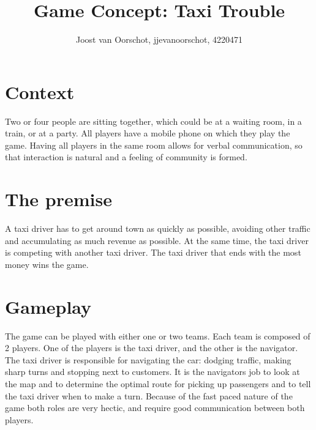 \documentclass[11pt,twoside,a4paper]{article}
\title{Game Concept: Taxi Trouble} %
\author{
        Joost van Oorschot, jjevanoorschot, 4220471
}
\begin{document}
\maketitle


\section*{Context}
Two or four people are sitting together, which could be at a waiting room, in a train, or at a party. All players have a mobile phone on which they play the game. Having all players in the same room allows for verbal communication, so that interaction is natural and a feeling of community is formed.

\section*{The premise}
A taxi driver has to get around town as quickly as possible, avoiding other traffic and accumulating as much revenue as possible. At the same time, the taxi driver is competing with another taxi driver. The taxi driver that ends with the most money wins the game.

\section*{Gameplay}
The game can be played with either one or two teams. Each team is composed of 2 players. One of the players is the taxi driver, and the other is the navigator. The taxi driver is responsible for navigating the car: dodging traffic, making sharp turns and stopping next to customers. It is the navigators job to look at the map and to determine the optimal route for picking up passengers and to tell the taxi driver when to make a turn. Because of the fast paced nature of the game both roles are very hectic, and require good communication between both players.
\end{document}
